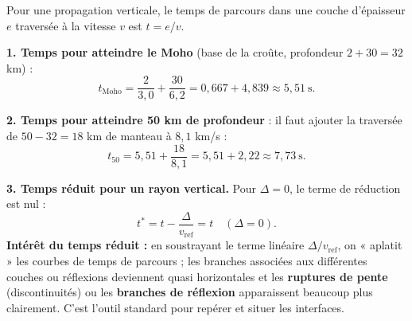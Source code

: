 \documentclass[11pt]{article}
\begin{document}
\begin{corrige}
Pour une propagation verticale, le temps de parcours dans une couche d'épaisseur $e$ traversée à la vitesse $v$ est $t = e/v$.

\textbf{1. Temps pour atteindre le Moho} (base de la croûte, profondeur $2 + 30 = 32$ km) :
\[ t_{\text{Moho}} = \frac{2}{3{,}0} + \frac{30}{6{,}2} = 0{,}667 + 4{,}839 \approx 5{,}51 \ \text{s}. \]

\textbf{2. Temps pour atteindre 50 km de profondeur} : il faut ajouter la traversée de $50 - 32 = 18$ km de manteau à $8,1$ km/s :
\[ t_{50} = 5{,}51 + \frac{18}{8{,}1} = 5{,}51 + 2{,}22 \approx 7{,}73 \ \text{s}. \]

\textbf{3. Temps réduit pour un rayon vertical.} Pour $\Delta = 0$, le terme de réduction est nul :
\[ t^* = t - \frac{\Delta}{v_{\text{ref}}} = t \quad (\Delta = 0). \]
\textbf{Intérêt du temps réduit :} en soustrayant le terme linéaire $\Delta / v_{\text{ref}}$, on « aplatit » les courbes de temps de parcours ; les branches associées aux différentes couches ou réflexions deviennent quasi horizontales et les \textbf{ruptures de pente} (discontinuités) ou les \textbf{branches de réflexion} apparaissent beaucoup plus clairement. C'est l'outil standard pour repérer et situer les interfaces.
\end{corrige}
\end{document}
